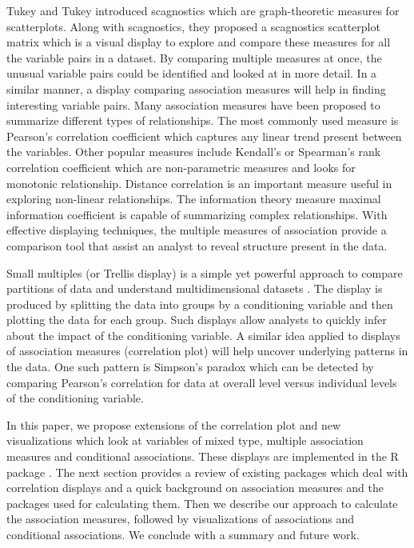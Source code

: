 Tukey and Tukey introduced scagnostics which are graph-theoretic
measures for scatterplots. Along with scagnostics, they proposed a
scagnostics scatterplot matrix which is a visual display to explore and
compare these measures for all the variable pairs in a dataset. By
comparing multiple measures at once, the unusual variable pairs could be
identified and looked at in more detail. In a similar manner, a display
comparing association measures will help in finding interesting variable
pairs. Many association measures have been proposed to summarize
different types of relationships. The most commonly used measure is
Pearson's correlation coefficient which captures any linear trend
present between the variables. Other popular measures include Kendall's
or Spearman's rank correlation coefficient which are non-parametric
measures and looks for monotonic relationship. Distance correlation
\citep{szekely2007measuring} is an important measure useful in exploring
non-linear relationships. The information theory measure maximal
information coefficient \citep{reshef2011detecting} is capable of
summarizing complex relationships. With effective displaying techniques,
the multiple measures of association provide a comparison tool that
assist an analyst to reveal structure present in the data.

Small multiples (or Trellis display) is a simple yet powerful approach
to compare partitions of data and understand multidimensional datasets
\citep{tufte1986thevisual}. The display is produced by splitting the
data into groups by a conditioning variable and then plotting the data
for each group. Such displays allow analysts to quickly infer about the
impact of the conditioning variable. A similar idea applied to displays
of association measures (correlation plot) will help uncover underlying
patterns in the data. One such pattern is Simpson's paradox which can be
detected by comparing Pearson's correlation for data at overall level
versus individual levels of the conditioning variable.

In this paper, we propose extensions of the correlation plot and new
visualizations which look at variables of mixed type, multiple
association measures and conditional associations. These displays are
implemented in the R package . The next section provides
a review of existing packages which deal with correlation displays and a
quick background on association measures and the packages used for
calculating them. Then we describe our approach to calculate the
association measures, followed by visualizations of associations and
conditional associations. We conclude with a summary and future work.

